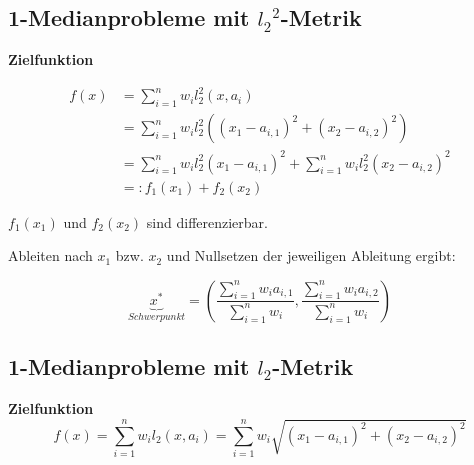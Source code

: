 
    \subsection{1-Medianprobleme mit ${l_2}^{2}$-Metrik} %
    \label{sub:1_medianprobleme_mit_l2^2_Metrik}

    \par \textbf{Zielfunktion}

    \begin{equation}
      \begin{aligned}
        f(x) &= \sum_{i=1}^{n}w_{i}l_{2}^{2}(x, a_i) \\
             &= \sum_{i=1}^{n}w_{i}l_{2}^{2}((x_1 - a_{i, 1})^2 + (x_2 - a_{i,2})^2) \\
             &= \sum_{i=1}^{n}w_{i}l_{2}^{2}(x_1 - a_{i, 1})^2 + \sum_{i=1}^{n}w_{i}l_{2}^{2}(x_2 - a_{i, 2})^2 \\
             &=: f_1(x_1) + f_2(x_2)
      \end{aligned}
    \end{equation}

    \par $f_1(x_1)$ und $f_2(x_2)$ sind differenzierbar.

    \par Ableiten nach $x_1$ bzw. $x_2$ und Nullsetzen der jeweiligen Ableitung ergibt:

    \begin{equation*}
      \underbrace{x^*}_{Schwerpunkt} = \left(\frac{\sum_{i=1}^{n}w_ia_{i,1}}{\sum_{i=1}^{n}w_i}, \frac{\sum_{i=1}^{n}w_ia_{i,2}}{\sum_{i=1}^{n}w_i} \right)
    \end{equation*}
    

    \subsection{1-Medianprobleme mit $l_2$-Metrik} %
    \label{sub:1_medianprobleme_mit_l2_Metrik}

      \begin{exmp}
        {\color{blue}{Aufgabe 8}}
      \end{exmp}
      

      \par \textbf{Zielfunktion}
      \begin{equation}
        f(x) = \sum_{i=1}^{n}w_il_2(x, a_i) = \sum_{i=1}^{n}w_i\sqrt{(x_1 - a_{i,1})^2 + (x_2 - a_{i,2})^2}
      \end{equation}

